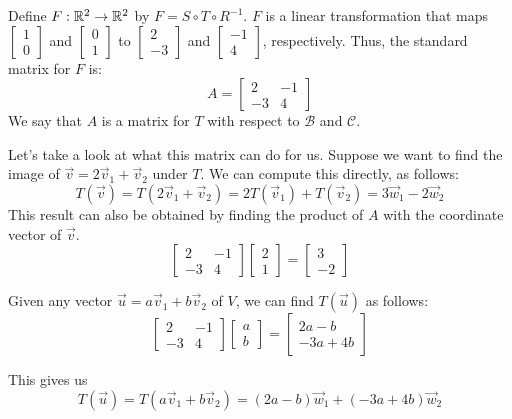 \documentclass{ximera}
\begin{document}
\begin{exploration}
\begin{center}
\end{center}



Define $F:\mathbb{R}^2\rightarrow \mathbb{R}^2$ by $F=S\circ T\circ R^{-1}$.  $F$ is a linear transformation that maps $\begin{bmatrix}1\\0\end{bmatrix}$ and $\begin{bmatrix}0\\1\end{bmatrix}$ to $\begin{bmatrix}2\\-3\end{bmatrix}$ and $\begin{bmatrix}-1\\4\end{bmatrix}$, respectively.  Thus, the standard matrix for $F$ is:
$$A=\begin{bmatrix}2&-1\\-3&4\end{bmatrix}$$
We say that $A$ is a matrix for $T$ with respect to $\mathcal{B}$ and $\mathcal{C}$.  

Let's take a look at what this matrix can do for us.  Suppose we want to find the image of $\vec{v}=2\vec{v}_1+\vec{v}_2$ under $T$.  We can compute this directly, as follows: $$T(\vec{v})=T(2\vec{v}_1+\vec{v}_2)=2T(\vec{v}_1)+T(\vec{v}_2)=3\vec{w}_1-2\vec{w}_2$$
This result can also be obtained by finding the product of $A$ with the coordinate vector of  $\vec{v}$.
$$\begin{bmatrix}2&-1\\-3&4\end{bmatrix}\begin{bmatrix}2\\1\end{bmatrix}=\begin{bmatrix}3\\-2\end{bmatrix}$$

Given any vector $\vec{u}=a\vec{v}_1+b\vec{v}_2$ of $V$, we can find $T(\vec{u})$ as follows:
$$\begin{bmatrix}2&-1\\-3&4\end{bmatrix}\begin{bmatrix}a\\b\end{bmatrix}=\begin{bmatrix}2a-b\\-3a+4b\end{bmatrix}$$

This gives us
$$T(\vec{u})=T(a\vec{v}_1+b\vec{v}_2)=(2a-b)\vec{w}_1+(-3a+4b)\vec{w}_2$$

\end{exploration}
\end{document}
